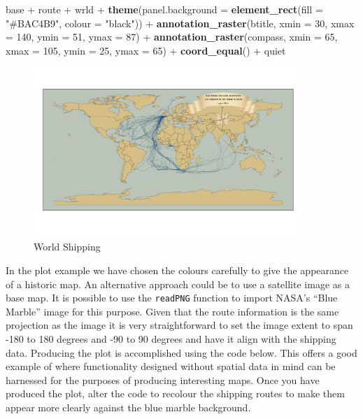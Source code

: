 \documentclass[]{article}
\newenvironment{Shaded}{}{}
\newcommand{\KeywordTok}[1]{\textcolor[rgb]{0.00,0.44,0.13}{\textbf{{#1}}}}
\newcommand{\DataTypeTok}[1]{\textcolor[rgb]{0.56,0.13,0.00}{{#1}}}
\newcommand{\DecValTok}[1]{\textcolor[rgb]{0.25,0.63,0.44}{{#1}}}
\newcommand{\StringTok}[1]{\textcolor[rgb]{0.25,0.44,0.63}{{#1}}}
\newcommand{\NormalTok}[1]{{#1}}
\let\Oldincludegraphics\includegraphics
\renewcommand{\includegraphics}[1]{\Oldincludegraphics[width=10cm]{#1}}
\begin{document}
\begin{Shaded}
\begin{Highlighting}[]
\NormalTok{base + route + wrld + }\KeywordTok{theme}\NormalTok{(}\DataTypeTok{panel.background =} \KeywordTok{element_rect}\NormalTok{(}\DataTypeTok{fill =} \StringTok{"#BAC4B9"}\NormalTok{, }
    \DataTypeTok{colour =} \StringTok{"black"}\NormalTok{)) + }\KeywordTok{annotation_raster}\NormalTok{(btitle, }\DataTypeTok{xmin =} \DecValTok{30}\NormalTok{, }\DataTypeTok{xmax =} \DecValTok{140}\NormalTok{, }\DataTypeTok{ymin =} \DecValTok{51}\NormalTok{, }
    \DataTypeTok{ymax =} \DecValTok{87}\NormalTok{) + }\KeywordTok{annotation_raster}\NormalTok{(compass, }\DataTypeTok{xmin =} \DecValTok{65}\NormalTok{, }\DataTypeTok{xmax =} \DecValTok{105}\NormalTok{, }\DataTypeTok{ymin =} \DecValTok{25}\NormalTok{, }
    \DataTypeTok{ymax =} \DecValTok{65}\NormalTok{) + }\KeywordTok{coord_equal}\NormalTok{() + quiet}
\end{Highlighting}
\end{Shaded}
\begin{figure}[htbp]
\centering 
\includegraphics{figs/World_Shipping}
\caption{World Shipping} \label{fship}
\end{figure}

In the plot example we have chosen the colours carefully to give the
appearance of a historic map. An alternative approach could be to use a
satellite image as a base map. It is possible to use the
\texttt{readPNG} function to import NASA's ``Blue Marble'' image for
this purpose. Given that the route information is the same projection as
the image it is very straightforward to set the image extent to span
-180 to 180 degrees and -90 to 90 degrees and have it align with the
shipping data. Producing the plot is accomplished using the code below.
This offers a good example of where functionality designed without
spatial data in mind can be harnessed for the purposes of producing
interesting maps. Once you have produced the plot, alter the code to
recolour the shipping routes to make them appear more clearly against
the blue marble background.
\end{document}
